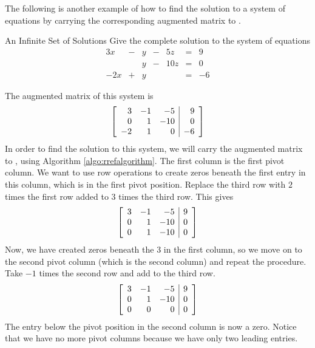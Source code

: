 The following is another example of how to find the solution to a system of equations by carrying the corresponding
augmented matrix to \rref. 

\begin{example}{An Infinite Set of Solutions}\label{exa:infinitesetofsoln}
Give the complete solution to the system of equations \:
\begin{equation}
\begin{array}{ccccccccc}
3x&-&y&-&5z&=&9 \\
&&y&-&10z&=&0 \\
-2x&+&y&&&=&-6
\end{array}
\end{equation}
\end{example}

\begin{solution} The augmented matrix of this system is
\begin{equation*}
\left[
\begin{array}{rrr|r}
 3 & -1 &  -5 & 9 \\
 0 &  1 & -10 & 0 \\
-2 &  1 &   0 & -6
\end{array}
\right]
\end{equation*}
In order to find the solution to this system, we will carry the augmented matrix to \rref, using Algorithm \ref{algo:rrefalgorithm}.
The first column is the first pivot column. We want to use row operations to create zeros beneath the first entry in this column, which is 
in the first pivot position. 
Replace the third row with $2$ times the first row added to $3$ times the
third row. This gives
\begin{equation*}
\left[
\begin{array}{rrr|r}
3 & -1 & -5 & 9 \\
0 & 1 & -10 & 0 \\
0 & 1 & -10 & 0
\end{array}
\right] 
\end{equation*}
Now, we have created zeros beneath the $3$ in the first column, so we move on to the second pivot column (which is the second column) and repeat the procedure. 
Take $-1$ times the second row and add to the third row.
\begin{equation*}
\left[
\begin{array}{rrr|r}
3 & -1 &  -5 & 9 \\
0 &  1 & -10 & 0 \\
0 &  0 &   0 & 0
\end{array}
\right]
\end{equation*}
The entry below the pivot position in the second column is now a zero. Notice that we have no more pivot columns because we 
have only two leading entries. 


\end{solution}
